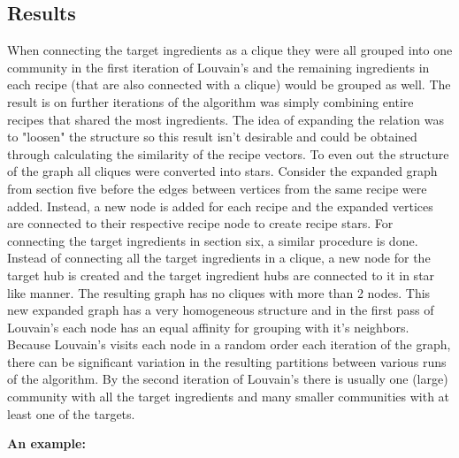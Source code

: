 \documentclass[conference]{IEEEtran}
\begin{document}
\subsection{Results}

When connecting the target ingredients as a clique they were all grouped into one community
in the first iteration of Louvain's and the remaining ingredients in each recipe (that are also
connected with a clique) would be grouped as well. The result is on further iterations of the
algorithm was simply combining entire recipes that shared the most ingredients. The idea of
expanding the relation was to "loosen" the structure so this result isn't desirable and could
be obtained through calculating the similarity of the recipe vectors. To even out the structure
of the graph all cliques were converted into stars. Consider the expanded graph from section five
before the edges between vertices from the same recipe were added. Instead, a new node is added
for each recipe and the expanded vertices are connected to their respective recipe node to create
recipe stars. For connecting the target ingredients in section six, a similar procedure is done.
Instead of connecting all the target ingredients in a clique, a new node for the target hub
is created and the target ingredient hubs are connected to it in star like manner. The resulting
graph has no cliques with more than 2 nodes. This new expanded graph has a very homogeneous
structure and in the first pass of Louvain's each node has an equal affinity for grouping
with it's neighbors. Because Louvain's visits each node in a random order each iteration of the
graph, there can be significant variation in the resulting partitions between various runs of
the algorithm. By the second iteration of Louvain's there is usually one (large) community with
all the target ingredients and many smaller communities with at least one of the targets. 

\textbf{An example:}
\end{document}
